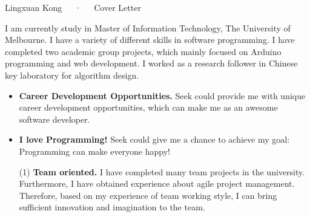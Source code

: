 \documentclass[11pt, a4paper]{awesome-cv}
\begin{document}
\makecvheader[C]

\makecvfooter
 {}
  {Lingxuan Kong~~~·~~~Cover Letter}
  {}

\makelettertitle

\begin{cvletter}

I am currently study in Master of Information Technology, The University of Melbourne. I have a variety of different skills in software programming. I have completed two academic group projects, which mainly focused on Arduino programming and web development. I worked as a research follower in Chinese key laboratory for algorithm design. 


\begin{itemize}
    \item \textbf{Career Development Opportunities. }Seek could provide me with unique career development opportunities, which can make me as an awesome software developer.
    
    
    \item \textbf{I love Programming! }Seek could give me a chance to achieve my goal: Programming can make everyone happy!
\end{itemize}





\begin{itemize}
    \item[(1)]\textbf{Team oriented.} I have completed many team projects in the university. Furthermore, I have obtained experience about agile project management. Therefore, based on my experience of team working style, I can bring sufficient innovation and imagination to the team. 
    

\end{itemize}
\end{cvletter}
\end{document}
